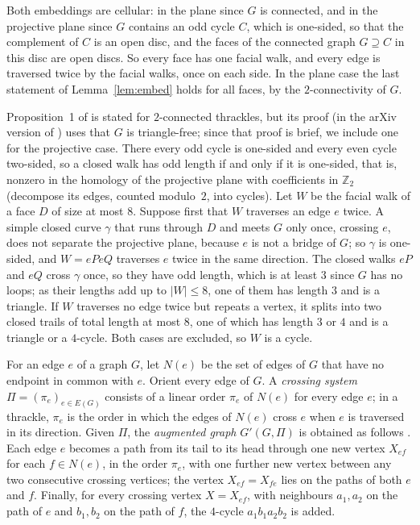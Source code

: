 \documentclass[11pt]{amsart}
\theoremstyle{definition}
\theoremstyle{remark}
\numberwithin{equation}{section}
\begin{document}
Both embeddings are cellular: in the plane since $G$ is connected, and in the projective plane since $G$ contains an odd cycle $C$, which is one-sided, so that the complement of $C$ is an open disc, and the faces of the connected graph $G\supseteq C$ in this disc are open discs. So every face has one facial walk, and every edge is traversed twice by the facial walks, once on each side. In the plane case the last statement of Lemma~\ref{lem:embed} holds for all faces, by the $2$-connectivity of $G$.

Proposition~1 of \cite{FP19} is stated for $2$-connected thrackles, but its proof (in the arXiv version of \cite{FP19}) uses that $G$ is triangle-free; since that proof is brief, we include one for the projective case. There every odd cycle is one-sided and every even cycle two-sided, so a closed walk has odd length if and only if it is one-sided, that is, nonzero in the homology of the projective plane with coefficients in $\mathbb Z_2$ (decompose its edges, counted modulo~$2$, into cycles). Let $W$ be the facial walk of a face $D$ of size at most $8$. Suppose first that $W$ traverses an edge $e$ twice. A simple closed curve $\gamma$ that runs through $D$ and meets $G$ only once, crossing $e$, does not separate the projective plane, because $e$ is not a bridge of $G$; so $\gamma$ is one-sided, and $W=ePeQ$ traverses $e$ twice in the same direction. The closed walks $eP$ and $eQ$ cross $\gamma$ once, so they have odd length, which is at least $3$ since $G$ has no loops; as their lengths add up to $|W|\le8$, one of them has length $3$ and is a triangle. If $W$ traverses no edge twice but repeats a vertex, it splits into two closed trails of total length at most $8$, one of which has length $3$ or $4$ and is a triangle or a $4$-cycle. Both cases are excluded, so $W$ is a cycle.

For an edge $e$ of a graph $G$, let $N(e)$ be the set of edges of $G$ that have no endpoint in common with $e$. Orient every edge of $G$. A \emph{crossing system} $\Pi=(\pi_e)_{e\in E(G)}$ consists of a linear order $\pi_e$ of $N(e)$ for every edge $e$; in a thrackle, $\pi_e$ is the order in which the edges of $N(e)$ cross $e$ when $e$ is traversed in its direction. Given $\Pi$, the \emph{augmented graph} $G'(G,\Pi)$ is obtained as follows \cite[Section~4]{FP11}. Each edge $e$ becomes a path from its tail to its head through one new vertex $X_{ef}$ for each $f\in N(e)$, in the order $\pi_e$, with one further new vertex between any two consecutive crossing vertices; the vertex $X_{ef}=X_{fe}$ lies on the paths of both $e$ and $f$. Finally, for every crossing vertex $X=X_{ef}$, with neighbours $a_1,a_2$ on the path of $e$ and $b_1,b_2$ on the path of $f$, the $4$-cycle $a_1b_1a_2b_2$ is added.
\end{document}
